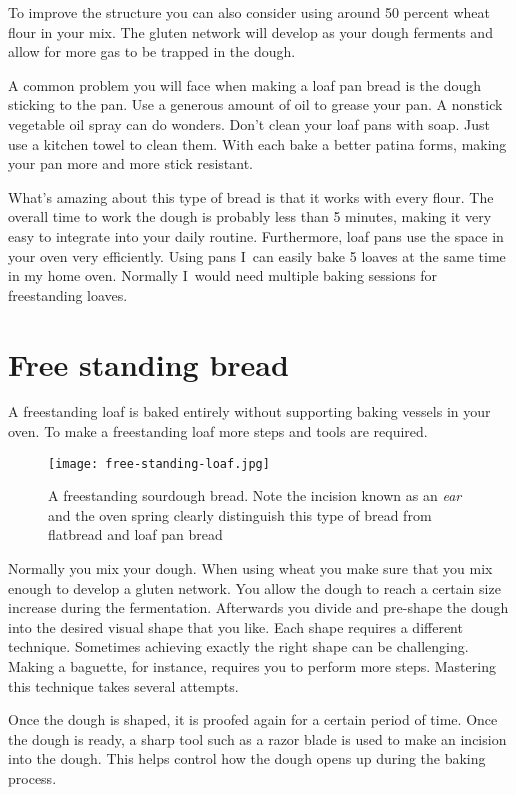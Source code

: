To improve the structure you can also consider using around 50 percent
wheat flour in your mix. The gluten network will develop as your
dough ferments and allow for more gas to be trapped in the dough.

A common problem you will face when making a loaf pan bread is
the dough sticking to the pan. Use a generous amount of oil to grease
your pan. A nonstick vegetable oil spray can do wonders.
Don't clean your loaf pans with soap. Just use a kitchen towel
to clean them. With each bake a better patina forms, making your
pan more and more stick resistant.

What's amazing about this type of bread is that it works
with every flour. The overall time to work the dough is probably
less than 5 minutes, making it very easy to integrate
into your daily routine. Furthermore, loaf pans use the space
in your oven very efficiently. Using pans I~can
easily bake 5 loaves at the same time in my home oven.
Normally I~would need multiple baking sessions for
freestanding loaves.

\section{Free standing bread}

A freestanding loaf is baked entirely without supporting
baking vessels in your oven. To make a freestanding loaf more steps
and tools are required.

\begin{figure}[!htb]
  \texttt{[image: free-standing-loaf.jpg]}
  \centering
  \caption{A freestanding sourdough bread. Note the incision known as an
      \emph{ear} and the oven spring clearly
  distinguish this type of bread from flatbread and loaf pan bread}
\end{figure}

Normally you mix your dough. When using wheat you make sure
that you mix enough to develop a gluten network.
You allow the dough to reach
a certain size increase during the fermentation. Afterwards you divide and pre-shape
the dough into the desired visual shape that you like.
Each shape requires a different technique. Sometimes achieving
exactly the right shape can be challenging. Making a baguette,
for instance, requires you to perform more steps. Mastering this
technique takes several attempts.

Once the dough is shaped, it is proofed again for a certain
period of time. Once the dough is ready, a sharp tool such
as a razor blade is used to make an incision into the dough.
This helps control how the dough opens up during the baking process.

